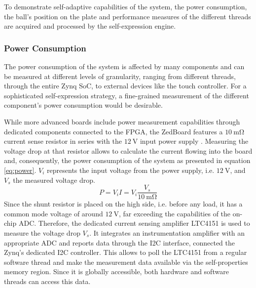 To demonstrate self-adaptive capabilities of the system, the power
consumption, the ball's position on the plate and performance measures of the
different threads are acquired and processed by the self-expression engine.

\subsubsection{Power Consumption}
\label{sssec:power}
The power consumption of the system is affected by many components and can be
measured at different levels of granularity, ranging from different threads,
through the entire Zynq \ac{SoC}, to external devices like the touch
controller. For a sophisticated self-expression strategy, a fine-grained
measurement of the different component's power consumption would be desirable.

While more advanced boards include power measurement capabilities through
dedicated components connected to the FPGA, the ZedBoard features a
$\SI{10}{\milli\ohm}$ current sense resistor in series with the
$\SI{12}{\volt}$ input power supply \citep{ZedBoard}. Measuring the voltage
drop at that resistor allows to calculate the current flowing into the board
and, consequently, the power consumption of the system as presented in
equation \ref{eq:power}. $V_i$ represents the input voltage from the power
supply, i.e. $\SI{12}{\volt}$, and $V_s$ the measured voltage drop.
\begin{equation}
P = V_i I = V_i \frac{V_s}{\SI{10}{\milli\ohm}}
\label{eq:power}
\end{equation}
Since the shunt resistor is placed on the high side, i.e. before any load, it
has a common mode voltage of around $\SI{12}{\volt}$, far exceeding the
capabilities of the on-chip \ac{ADC}. Therefore, the dedicated current sensing
amplifier LTC4151 is used to measure the voltage drop $V_s$. It integrates an
instrumentation amplifier with an appropriate \ac{ADC} and reports data
through the \ac{I2C} interface, connected the Zynq's dedicated \ac{I2C}
controller. This allows to poll the LTC4151 from a regular software thread and
make the measurement data available via the self-properties memory region.
Since it is globally accessible, both hardware and software threads can access
this data.

